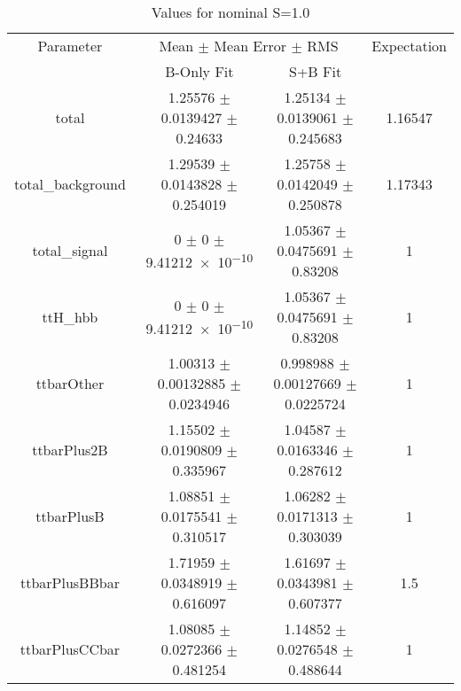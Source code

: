 \begin{table}
\centering
\caption{Values for nominal S=1.0}
\begin{tabular}{cccc}
\toprule
Parameter & \multicolumn{2}{c}{Mean $\pm$ Mean Error $\pm$ RMS} & Expectation\\
 & B-Only Fit & S+B Fit & \\
\midrule
total & \num{1.25576} $\pm$ \num{0.0139427} $\pm$ \num{0.24633} & \num{1.25134} $\pm$ \num{0.0139061} $\pm$ \num{0.245683} & \num{1.16547}\\
total\_background & \num{1.29539} $\pm$ \num{0.0143828} $\pm$ \num{0.254019} & \num{1.25758} $\pm$ \num{0.0142049} $\pm$ \num{0.250878} & \num{1.17343}\\
total\_signal & \num{0} $\pm$ \num{0} $\pm$ \num{9.41212e-10} & \num{1.05367} $\pm$ \num{0.0475691} $\pm$ \num{0.83208} & \num{1}\\
ttH\_hbb & \num{0} $\pm$ \num{0} $\pm$ \num{9.41212e-10} & \num{1.05367} $\pm$ \num{0.0475691} $\pm$ \num{0.83208} & \num{1}\\
ttbarOther & \num{1.00313} $\pm$ \num{0.00132885} $\pm$ \num{0.0234946} & \num{0.998988} $\pm$ \num{0.00127669} $\pm$ \num{0.0225724} & \num{1}\\
ttbarPlus2B & \num{1.15502} $\pm$ \num{0.0190809} $\pm$ \num{0.335967} & \num{1.04587} $\pm$ \num{0.0163346} $\pm$ \num{0.287612} & \num{1}\\
ttbarPlusB & \num{1.08851} $\pm$ \num{0.0175541} $\pm$ \num{0.310517} & \num{1.06282} $\pm$ \num{0.0171313} $\pm$ \num{0.303039} & \num{1}\\
ttbarPlusBBbar & \num{1.71959} $\pm$ \num{0.0348919} $\pm$ \num{0.616097} & \num{1.61697} $\pm$ \num{0.0343981} $\pm$ \num{0.607377} & \num{1.5}\\
ttbarPlusCCbar & \num{1.08085} $\pm$ \num{0.0272366} $\pm$ \num{0.481254} & \num{1.14852} $\pm$ \num{0.0276548} $\pm$ \num{0.488644} & \num{1}\\
\bottomrule
\end{tabular}
\end{table}